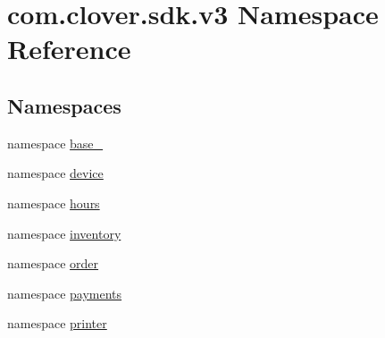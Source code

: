 \hypertarget{namespacecom_1_1clover_1_1sdk_1_1v3}{}\section{com.\+clover.\+sdk.\+v3 Namespace Reference}
\label{namespacecom_1_1clover_1_1sdk_1_1v3}
\subsection*{Namespaces}
\begin{DoxyCompactItemize}
\item 
namespace \hyperlink{namespacecom_1_1clover_1_1sdk_1_1v3_1_1base__}{base\+\_\+}
\item 
namespace \hyperlink{namespacecom_1_1clover_1_1sdk_1_1v3_1_1device}{device}
\item 
namespace \hyperlink{namespacecom_1_1clover_1_1sdk_1_1v3_1_1hours}{hours}
\item 
namespace \hyperlink{namespacecom_1_1clover_1_1sdk_1_1v3_1_1inventory}{inventory}
\item 
namespace \hyperlink{namespacecom_1_1clover_1_1sdk_1_1v3_1_1order}{order}
\item 
namespace \hyperlink{namespacecom_1_1clover_1_1sdk_1_1v3_1_1payments}{payments}
\item 
namespace \hyperlink{namespacecom_1_1clover_1_1sdk_1_1v3_1_1printer}{printer}
\end{DoxyCompactItemize}
